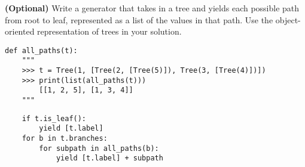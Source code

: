 \begin{blocksection}
\question \textbf{(Optional)} Write a generator that takes in a tree and yields each possible path from root to leaf, represented as a list of the values in that path. Use the object-oriented representation of trees in your solution.
\newline

\begin{lstlisting}
def all_paths(t):
    """
    >>> t = Tree(1, [Tree(2, [Tree(5)]), Tree(3, [Tree(4)])])
    >>> print(list(all_paths(t)))
        [[1, 2, 5], [1, 3, 4]]
    """    
\end{lstlisting}

\begin{solution}[0.5in]
\begin{lstlisting}
    if t.is_leaf():
        yield [t.label]
    for b in t.branches:
        for subpath in all_paths(b):
            yield [t.label] + subpath
\end{lstlisting}

\end{solution}
\end{blocksection}

